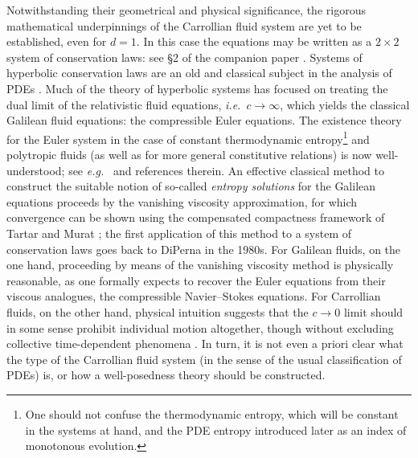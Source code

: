 \documentclass[11pt,a4paper,reqno]{amsart}
\numberwithin{equation}{section}
\theoremstyle{definition}
\theoremstyle{remark}
\begin{document}
Notwithstanding their geometrical and physical significance, the rigorous mathematical underpinnings of the Carrollian fluid system are yet to be established, even for $d=1$. In this case the equations may be written as a $2 \times 2$ system of conservation laws: see \S2 of the companion paper \cite{AthanasiouPetropoulosSchulzTaujanskas24b}. Systems of hyperbolic conservation laws are an old and classical subject in the analysis of PDEs \cite{Dafermos2016,Serre1,Serre2}. Much of the theory of hyperbolic systems has focused on treating the dual limit of the relativistic fluid equations, \textit{i.e.}~$c \to \infty$, which yields the classical Galilean fluid equations: the compressible Euler equations. The existence theory for the Euler system in the case of constant thermodynamic entropy\footnote{One should not confuse the thermodynamic entropy, which will be constant in the systems at hand, and the PDE entropy introduced later as an index of monotonous evolution.} and polytropic fluids (as well as for more general constitutive relations) is now well-understood; see \textit{e.g.}~\cite{Chen86,DingChenLuo85,LionsPerthameTadmor94,LionsPerthameSouganidis96,ChenLeFloch,Matthew} and references therein. An effective classical method to construct the suitable notion of so-called \emph{entropy solutions} for the Galilean equations proceeds by the vanishing viscosity approximation, for which convergence can be shown using the compensated compactness framework of Tartar and Murat \cite{Tartar78,Tartar79}; the first application of this method to a system of conservation laws goes back to DiPerna \cite{DiPerna83a,DiPerna83b} in the 1980s. For Galilean fluids, on the one hand, proceeding by means of the vanishing viscosity method is physically reasonable, as one formally expects to recover the Euler equations from their viscous analogues, the compressible Navier--Stokes equations. For Carrollian fluids, on the other hand, physical intuition suggests that the $c \to 0$ limit should in some sense prohibit individual motion altogether, though without excluding collective time-dependent phenomena \cite{BergshoeffGomisLonghi2014}. In turn, it is not even a priori clear what the type of the Carrollian fluid system (in the sense of the usual classification of PDEs) is, or how a well-posedness theory should be constructed.
\end{document}
